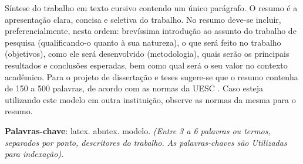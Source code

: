 %
%


\begin{center}
\imprimirtitulo
\end{center}

\begin{resumo}
Síntese do trabalho em texto cursivo contendo um único parágrafo. O resumo é a apresentação clara, concisa e seletiva do trabalho.
No resumo deve-se incluir, preferencialmente, nesta ordem: brevíssima introdução ao assunto do trabalho de pesquisa (qualificando-o quanto à sua natureza), o que será feito no trabalho (objetivos), como ele será desenvolvido (metodologia), quais serão os principais resultados e conclusões esperadas, bem como qual será o seu valor no contexto acadêmico. Para o projeto de dissertação e teses sugere-se que o resumo contenha de 150 a 500 palavras, de acordo com as normas da UESC \cite{normasuesc}. Caso esteja utilizando este modelo em outra instituição, observe as normas da mesma para o resumo.

\textbf{Palavras-chave}: latex. abntex. modelo.
 \textit{(Entre 3 a 6 palavras ou termos, separados por ponto, descritores do trabalho. As palavras-chaves são Utilizadas para indexação).}

\end{resumo}
